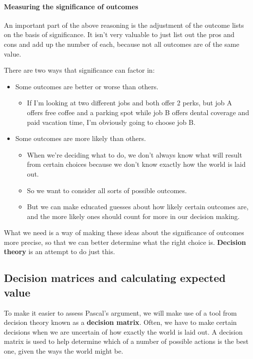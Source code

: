 \documentclass[letterpaper,10pt]{article}
\begin{document}
\paragraph{Measuring the significance of outcomes} An important part of the above reasoning is the adjustment of the outcome lists on the basis of significance.  It isn't very valuable to just list out the pros and cons and add up the number of each, because not all outcomes are of the same value. 

There are two ways that significance can factor in:
\begin{itemize}
 \item Some outcomes are better or worse than others.  
  \begin{itemize}
    \item If I'm looking at two different jobs and both offer 2 perks, but job A offers free coffee and a parking spot while job B offers dental coverage and paid vacation time, I'm obviously going to choose job B.
  \end{itemize}
 \item Some outcomes are more likely than others.
  \begin{itemize}
   \item When we're deciding what to do, we don't always know what will result from certain choices because we don't know exactly how the world is laid out.
   \item So we want to consider all sorts of possible outcomes.
   \item But we can make educated guesses about how likely certain outcomes are, and the more likely ones should count for more in our decision making.
  \end{itemize}
\end{itemize}
What we need is a way of making these ideas about the significance of outcomes more precise, so that we can better determine what the right choice is.  \textbf{Decision theory} is an attempt to do just this.

\subsection{Decision matrices and calculating expected value}

To make it easier to assess Pascal's argument, we will make use of a tool from decision theory known as a \textbf{decision matrix}.  Often, we have to make certain decisions when we are uncertain of how exactly the world is laid out. A decision matrix is used to help determine which of a number of possible actions is the best one, given the ways the world might be.
\end{document}
